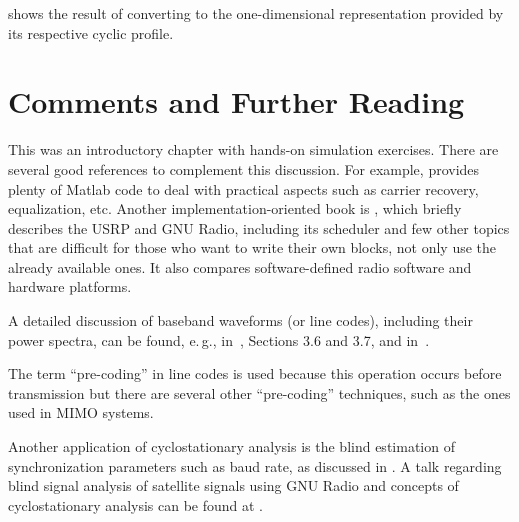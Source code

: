  shows the result of converting  to  the one-dimensional representation provided by its respective cyclic profile.
\eApplication 


\section{Comments and Further Reading}

This was an introductory chapter with hands-on simulation exercises. There are several good references to complement this discussion. For example, \cite{Johnson11} provides plenty of Matlab code to deal with practical aspects such as carrier recovery, equalization, etc.
Another implementation-oriented book is \cite{Grayver13}, which briefly describes the USRP and GNU Radio, including its scheduler and few other topics that are difficult for those who want to write their own blocks, not only use the already available ones. %
It also compares software-defined radio software and hardware platforms.

A detailed discussion of baseband waveforms (or line codes), including their power spectra, can be found, e.\,g., in~\cite{Peebles86}, Sections 3.6 and 3.7, and in~\cite{Proakis07}.

The term ``pre-coding'' in line codes is used because this operation occurs before transmission but there
are several other ``pre-coding'' techniques, such as the ones used in MIMO systems.

Another application of cyclostationary analysis is the blind estimation of synchronization parameters such as baud rate, as discussed in \cite{Gardner91,Mosquera08}. A talk regarding blind signal analysis of satellite signals using GNU Radio and concepts of cyclostationary analysis can be found at .

